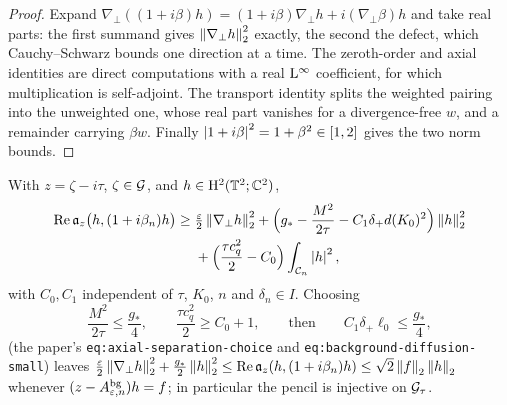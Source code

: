 \begin{proof}
  \leanok
  Expand $\nabla_\perp((1+i\beta)h)=(1+i\beta)\nabla_\perp h+i(\nabla_\perp\beta)h$ and take
  real parts: the first summand gives $\left\|\nabla_\perp h\right\|_2^2$ exactly, the second the
  defect, which Cauchy--Schwarz bounds one direction at a time.  The zeroth-order and axial
  identities are direct computations with a real $\mathrm{L}^\infty$ coefficient, for which
  multiplication is self-adjoint.  The transport identity splits the weighted pairing into
  the unweighted one, whose real part vanishes for a divergence-free $w$, and a remainder
  carrying $\beta w$.  Finally $\left\lvert1+i\beta\right\rvert^2=1+\beta^2\in[1,2]$ gives the two norm
  bounds.
\end{proof}

\begin{lemma}
  \label{lem:background:coercivity}
  \leanok
  With $z=\zeta-i\tau$, $\zeta\in\mathcal{G}$, and $h\in\mathrm{H}^2(\mathbb{T}^2;\mathbb{C}^2)$,
  \begin{align}
    \operatorname{Re}\mathfrak a_z\bigl(h,(1+i\beta_n)h\bigr)
    \geq{}&\tfrac{\varepsilon}2\left\|\nabla_\perp h\right\|_2^2
      +\Bigl(g_*-\frac{M^2}{2\tau}-C_1\delta_+d(K_0)^2\Bigr)\left\|h\right\|_2^2\notag\\
      &+\Bigl(\frac{\tau c_q^2}2-C_0\Bigr)\int_{\mathcal C_n}\left\lvert h\right\rvert^2,
    \label{eq:background:coercivity}
  \end{align}
  with $C_0,C_1$ independent of $\tau$, $K_0$, $n$ and $\delta_n\in I$.  Choosing
  \begin{equation}
    \frac{M^2}{2\tau}\leq\frac{g_*}4,\qquad\frac{\tau c_q^2}2\geq C_0+1,
    \qquad\text{then}\qquad C_1\delta_+\ell_0\leq\frac{g_*}4,
    \label{eq:background:axial-separation-choice}
  \end{equation}
  (the paper's \texttt{eq:axial-separation-choice} and \texttt{eq:background-diffusion-small})
leaves $\tfrac{\varepsilon}2\left\|\nabla_\perp h\right\|_2^2+\tfrac{g_*}2\left\|h\right\|_2^2
  \leq\operatorname{Re}\mathfrak a_z(h,(1+i\beta_n)h)\leq\sqrt2\left\|f\right\|_2\left\|h\right\|_2$ whenever
  $(z-A^{\rm bg}_{\varepsilon,n})h=f$; in particular the pencil is injective on $\mathcal{G}_\tau$.
\end{lemma}

